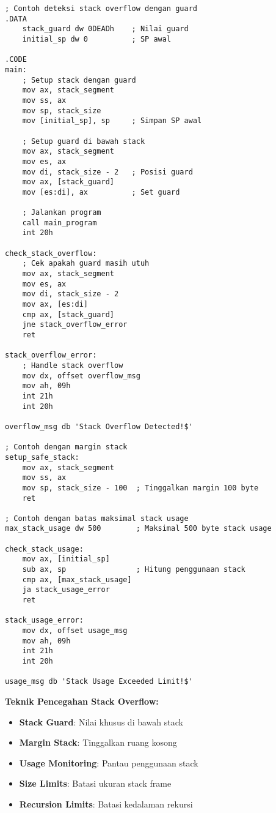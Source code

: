 \documentclass[../main.tex]{subfiles}
\begin{document}
                \begin{lstlisting}[language={[x86masm]Assembler}, caption=Deteksi Stack Overflow, label={lst:stack-overflow}]
; Contoh deteksi stack overflow dengan guard
.DATA
    stack_guard dw 0DEADh    ; Nilai guard
    initial_sp dw 0          ; SP awal

.CODE
main:
    ; Setup stack dengan guard
    mov ax, stack_segment
    mov ss, ax
    mov sp, stack_size
    mov [initial_sp], sp     ; Simpan SP awal
    
    ; Setup guard di bawah stack
    mov ax, stack_segment
    mov es, ax
    mov di, stack_size - 2   ; Posisi guard
    mov ax, [stack_guard]
    mov [es:di], ax          ; Set guard
    
    ; Jalankan program
    call main_program
    int 20h

check_stack_overflow:
    ; Cek apakah guard masih utuh
    mov ax, stack_segment
    mov es, ax
    mov di, stack_size - 2
    mov ax, [es:di]
    cmp ax, [stack_guard]
    jne stack_overflow_error
    ret

stack_overflow_error:
    ; Handle stack overflow
    mov dx, offset overflow_msg
    mov ah, 09h
    int 21h
    int 20h

overflow_msg db 'Stack Overflow Detected!$'

; Contoh dengan margin stack
setup_safe_stack:
    mov ax, stack_segment
    mov ss, ax
    mov sp, stack_size - 100  ; Tinggalkan margin 100 byte
    ret

; Contoh dengan batas maksimal stack usage
max_stack_usage dw 500        ; Maksimal 500 byte stack usage

check_stack_usage:
    mov ax, [initial_sp]
    sub ax, sp                ; Hitung penggunaan stack
    cmp ax, [max_stack_usage]
    ja stack_usage_error
    ret

stack_usage_error:
    mov dx, offset usage_msg
    mov ah, 09h
    int 21h
    int 20h

usage_msg db 'Stack Usage Exceeded Limit!$'
                \end{lstlisting}

                \textbf{Teknik Pencegahan Stack Overflow:}
                \begin{itemize}
                    \item \textbf{Stack Guard}: Nilai khusus di bawah stack
                    \item \textbf{Margin Stack}: Tinggalkan ruang kosong
                    \item \textbf{Usage Monitoring}: Pantau penggunaan stack
                    \item \textbf{Size Limits}: Batasi ukuran stack frame
                    \item \textbf{Recursion Limits}: Batasi kedalaman rekursi
                \end{itemize}
\end{document}
